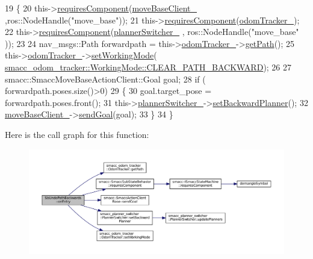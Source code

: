 \begin{DoxyCode}
19   \{
20     this->\hyperlink{classsmacc_1_1SmaccSubStateBehavior_a4d25c4ba8ec01c489df172a71bb1c37d}{requiresComponent}(\hyperlink{classSbUndoPathBackwards_ad201bd8837a54bd7df0efc8d72fdb151}{moveBaseClient\_} ,ros::NodeHandle(\textcolor{stringliteral}{"move\_base"}));
21     this->\hyperlink{classsmacc_1_1SmaccSubStateBehavior_a4d25c4ba8ec01c489df172a71bb1c37d}{requiresComponent}(\hyperlink{classSbUndoPathBackwards_a4e543595d070980fb5cb621232904048}{odomTracker\_});
22     this->\hyperlink{classsmacc_1_1SmaccSubStateBehavior_a4d25c4ba8ec01c489df172a71bb1c37d}{requiresComponent}(\hyperlink{classSbUndoPathBackwards_a881b1b8e6bcab14d59e26c09aaa3c7c0}{plannerSwitcher\_} , ros::NodeHandle(\textcolor{stringliteral}{"move\_base"}
      ));   
23 
24     nav\_msgs::Path forwardpath = this->\hyperlink{classSbUndoPathBackwards_a4e543595d070980fb5cb621232904048}{odomTracker\_}->\hyperlink{classsmacc__odom__tracker_1_1OdomTracker_ace0762f93bc272a426d3038f74dc8752}{getPath}();
25     this->\hyperlink{classSbUndoPathBackwards_a4e543595d070980fb5cb621232904048}{odomTracker\_}->\hyperlink{classsmacc__odom__tracker_1_1OdomTracker_a38fbca999297c46dc95628cc60851a45}{setWorkingMode}(
      \hyperlink{namespacesmacc__odom__tracker_ade9730dd5cc10ccfad9362176cf46c33a0cf8f27617189e35619df3c18bda6274}{smacc\_odom\_tracker::WorkingMode::CLEAR\_PATH\_BACKWARD});
26     
27     smacc::SmaccMoveBaseActionClient::Goal goal;
28     \textcolor{keywordflow}{if} ( forwardpath.poses.size()>0)
29     \{
30       goal.target\_pose = forwardpath.poses.front();
31       this->\hyperlink{classSbUndoPathBackwards_a881b1b8e6bcab14d59e26c09aaa3c7c0}{plannerSwitcher\_}->\hyperlink{classsmacc__planner__switcher_1_1PlannerSwitcher_a848558a4309a42c546ab87e65722da2f}{setBackwardPlanner}();
32       \hyperlink{classSbUndoPathBackwards_ad201bd8837a54bd7df0efc8d72fdb151}{moveBaseClient\_}->\hyperlink{classsmacc_1_1SmaccActionClientBase_a58c67a87c5fb8ea1633573c58fe3eee1}{sendGoal}(goal);
33     \}
34   \}    
\end{DoxyCode}


Here is the call graph for this function\+:
\nopagebreak
\begin{figure}[H]
\begin{center}
\leavevmode
\includegraphics[width=350pt]{classSbUndoPathBackwards_ab7eed4fa4633235b877758bd787bbea1_cgraph}
\end{center}
\end{figure}




